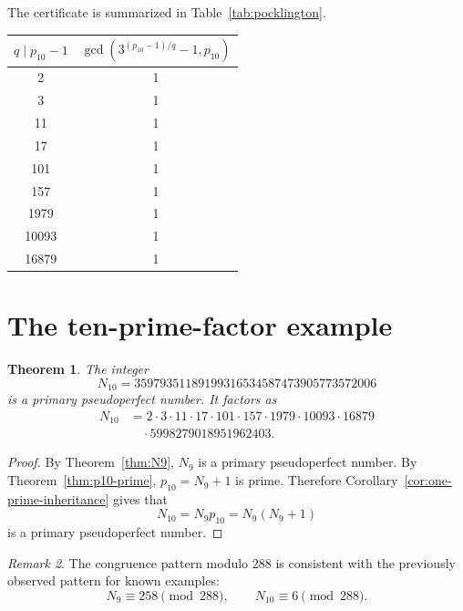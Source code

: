 \documentclass[11pt]{amsart}
\theoremstyle{plain}
\newtheorem{theorem}{Theorem}[section]
\theoremstyle{definition}
\theoremstyle{remark}
\newtheorem{remark}[theorem]{Remark}
\begin{document}
The certificate is summarized in Table~\ref{tab:pocklington}.

\begin{center}
\begin{tabular}{cc}
\toprule
$q\mid p_{10}-1$ & $\gcd(3^{(p_{10}-1)/q}-1,p_{10})$ \\
\midrule
2 & 1 \\
3 & 1 \\
11 & 1 \\
17 & 1 \\
101 & 1 \\
157 & 1 \\
1979 & 1 \\
10093 & 1 \\
16879 & 1 \\
\bottomrule
\end{tabular}
\label{tab:pocklington}
\end{center}

\section{The ten-prime-factor example}

\begin{theorem}\label{thm:N10}
The integer
\[
        N_{10}=35979351189199316534587473905773572006
\]
is a primary pseudoperfect number.  It factors as
\[
\begin{aligned}
        N_{10}
        &=2\cdot3\cdot11\cdot17\cdot101\cdot157\cdot1979\cdot10093\cdot16879\\
        &\quad\cdot5998279018951962403.
\end{aligned}
\]
\end{theorem}

\begin{proof}
By Theorem~\ref{thm:N9}, $N_9$ is a primary pseudoperfect number.  By Theorem~\ref{thm:p10-prime}, $p_{10}=N_9+1$ is prime.  Therefore Corollary~\ref{cor:one-prime-inheritance} gives that
\[
        N_{10}=N_9p_{10}=N_9(N_9+1)
\]
is a primary pseudoperfect number.
\end{proof}

\begin{remark}
The congruence pattern modulo $288$ is consistent with the previously observed pattern for known examples:
\[
        N_9\equiv258\pmod{288},
        \qquad
        N_{10}\equiv6\pmod{288}.
\]
\end{remark}
\end{document}
